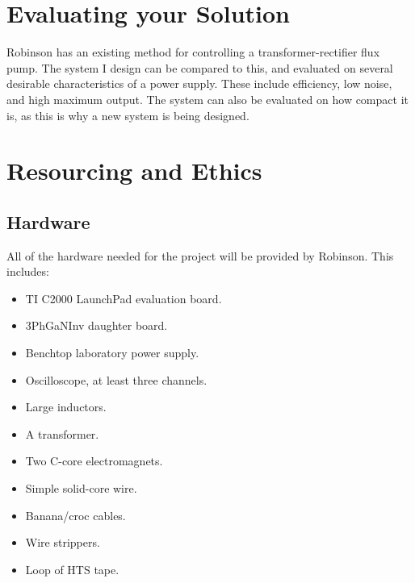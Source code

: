 \documentclass[11pt, a4paper, twoside, openright]{article}
\begin{document}
\section{Evaluating your Solution}
Robinson has an existing method for controlling a transformer-rectifier flux pump. The system I design can be compared to this, and evaluated on several desirable characteristics of a power supply. These include efficiency, low noise, and high maximum output. The system can also be evaluated on how compact it is, as this is why a new system is being designed.

\section{Resourcing and Ethics}


\subsection{Hardware}
All of the hardware needed for the project will be provided by Robinson. This includes:
\begin{itemize}
	\item TI C2000 LaunchPad evaluation board.
	\item 3PhGaNInv daughter board.
	\item Benchtop laboratory power supply.
	\item Oscilloscope, at least three channels.
	\item Large inductors.
	\item A transformer.
	\item Two C-core electromagnets.
	\item Simple solid-core wire.
	\item Banana/croc cables.
	\item Wire strippers.
	\item Loop of HTS tape.
\end{itemize}
\end{document}
